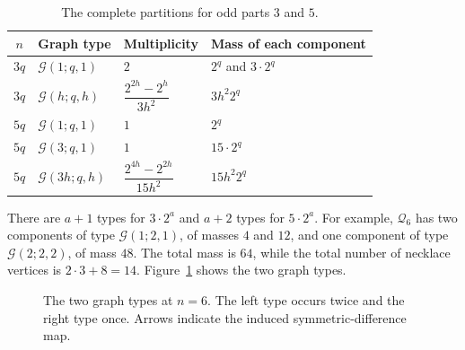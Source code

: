 \documentclass[11pt]{article}
\theoremstyle{definition}
\theoremstyle{remark}
\numberwithin{equation}{section}
\newcommand{\G}{\mathcal G}
\newcommand{\Q}{\mathcal Q}
\begin{document}
\begin{table}[htbp]
\centering
\small
\renewcommand{\arraystretch}{1.45}
\begin{tabular}{@{}clll@{}}
\toprule
$n$ & Graph type & Multiplicity & Mass of each component\\
\midrule
$3q$ & $\G(1;q,1)$ & $2$ & $2^q$ and $3\cdot2^q$\\
$3q$ & $\G(h;q,h)$ & $\dfrac{2^{2h}-2^h}{3h^2}$ & $3h^2 2^q$\\
\addlinespace
$5q$ & $\G(1;q,1)$ & $1$ & $2^q$\\
$5q$ & $\G(3;q,1)$ & $1$ & $15\cdot2^q$\\
$5q$ & $\G(3h;q,h)$ & $\dfrac{2^{4h}-2^{2h}}{15h^2}$ & $15h^2 2^q$\\
\bottomrule
\end{tabular}
\caption{The complete partitions for odd parts $3$ and $5$.}
\label{tab:three-five}
\end{table}

There are $a+1$ types for $3\cdot2^a$ and $a+2$ types for $5\cdot2^a$.
For example, $\Q_6$ has two components of type $\G(1;2,1)$, of masses
$4$ and $12$, and one component of type $\G(2;2,2)$, of mass $48$.
The total mass is $64$, while the total number of necklace vertices is
$2\cdot3+8=14$. Figure~\ref{fig:six} shows the two graph types.

\begin{figure}[htbp]
\centering
{}
\caption{The two graph types at $n=6$. The left type occurs twice and the
right type once. Arrows indicate the induced symmetric-difference map.}
\label{fig:six}
\end{figure}
\end{document}
